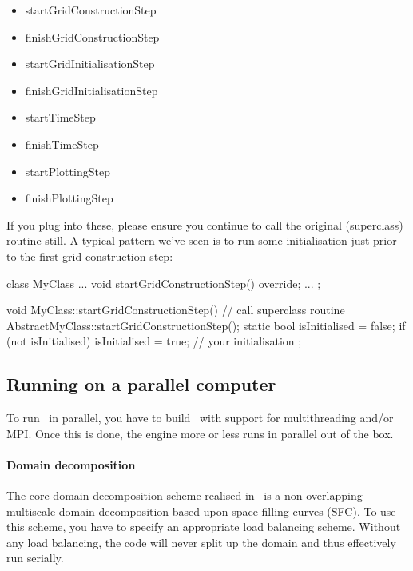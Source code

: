 \begin{itemize}
  \item startGridConstructionStep
  \item finishGridConstructionStep
  \item startGridInitialisationStep
  \item finishGridInitialisationStep
  \item startTimeStep
  \item finishTimeStep
  \item startPlottingStep
  \item finishPlottingStep   
\end{itemize}


\noindent
If you plug into these, please ensure you continue to call the original
(superclass) routine still.
A typical pattern we've seen is to run some initialisation just prior to the
first grid construction step:

\begin{code}
class MyClass ... {
  void startGridConstructionStep() override;
  ...
};
\end{code}



\begin{code}
void MyClass::startGridConstructionStep() {
  // call superclass routine
  AbstractMyClass::startGridConstructionStep();
  static bool isInitialised = false;
  if (not isInitialised) {
    isInitialised = true;
    // your initialisation
  }
};
\end{code}

\subsection{Running on a parallel computer}

To run \ExaHyPE\ in parallel, you have to build \Peano\ with support for
multithreading and/or MPI.
Once this is done, the engine more or less runs in parallel out of the box.


\paragraph{Domain decomposition}
The core domain decomposition scheme realised in \ExaHyPE\ is a non-overlapping
multiscale domain decomposition based upon space-filling curves (SFC).
To use this scheme, you have to specify an appropriate load balancing scheme.
Without any load balancing, the code will never split up the domain and thus
effectively run serially.

